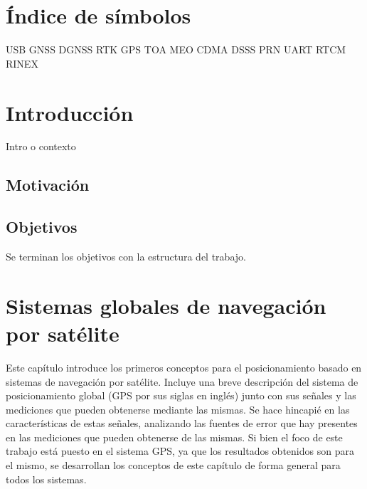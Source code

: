 \documentclass[a4paper,12pt,oneside,onecolumn,final,openright]{book}%
\begin{document}
\tableofcontents
\newpage

\chapter*{Índice de símbolos}
USB
GNSS
DGNSS
RTK
GPS
TOA
MEO
CDMA
DSSS
PRN
UART
RTCM
RINEX
\newpage

\listoffigures


\chapter*{Introducción}
Intro o contexto
\section*{Motivación}
\section*{Objetivos}
Se terminan los objetivos con la estructura del trabajo.
\chapter{Sistemas globales de navegación por satélite}\label{ch:GNSS}
	Este capítulo introduce los primeros conceptos para el posicionamiento basado en sistemas de navegación por satélite. Incluye una breve descripción del sistema de posicionamiento global (GPS por sus siglas en inglés) junto con sus señales y las mediciones que pueden obtenerse mediante las mismas. Se hace hincapié en las características de estas señales, analizando las fuentes de error que hay presentes en las mediciones que pueden obtenerse de las mismas. Si bien el foco de este trabajo está puesto en el sistema GPS, ya que los resultados obtenidos son para el mismo, se desarrollan los conceptos de este capítulo de forma general para todos los sistemas. 
	
\end{document}
